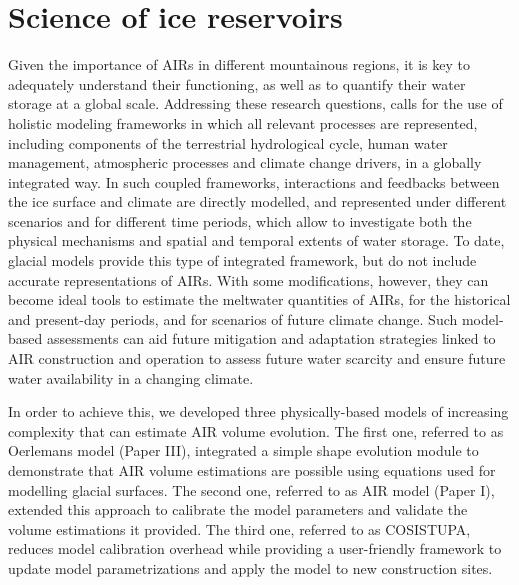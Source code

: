 \chapter{Science of ice reservoirs}
\label{chap:science}


Given the importance of \ac{AIRs} in different mountainous regions, it is key to adequately understand their
functioning, as well as to quantify their water storage at a global scale. Addressing these research questions,
calls for the use of holistic modeling frameworks in which all relevant processes are represented, including
components of the terrestrial hydrological cycle, human water management, atmospheric processes and climate
change drivers, in a globally integrated way. In such coupled frameworks, interactions and feedbacks between the
ice surface and climate are directly modelled, and represented under different scenarios and for different time
periods, which allow to investigate both the physical mechanisms and spatial and temporal extents of water
storage. To date, glacial models provide this type of integrated framework, but do not include accurate
representations of \ac{AIRs}. With some modifications, however, they can become ideal tools to estimate the
meltwater quantities of \ac{AIRs}, for the historical and present-day periods, and for scenarios of future
climate change. Such model-based assessments can aid future mitigation and adaptation strategies linked to AIR
construction and operation to assess future water scarcity and ensure future water availability in a changing
climate.

In order to achieve this, we developed three physically-based models of increasing complexity that can estimate
AIR volume evolution. The first one, referred to as Oerlemans model (Paper III), integrated a simple shape
evolution module to demonstrate that AIR volume estimations are possible using equations used for modelling
glacial surfaces. The second one, referred to as AIR model (Paper I), extended this approach to calibrate the
model parameters and validate the volume estimations it provided. The third one, referred to as COSISTUPA,
reduces model calibration overhead while providing a user-friendly framework to update model parametrizations
and apply the model to new construction sites. 

